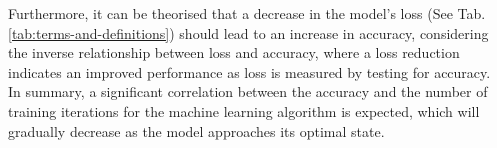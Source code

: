 Furthermore, it can be theorised that a decrease in the model's loss (See Tab. \ref{tab:terms-and-definitions}) should lead to an increase in accuracy, considering the inverse relationship between loss and accuracy, where a loss reduction indicates an improved performance as loss is measured by testing for accuracy.\\


In summary, a significant correlation between the accuracy and the number of training iterations for the machine learning algorithm is expected, which will gradually decrease as the model approaches its optimal state.



